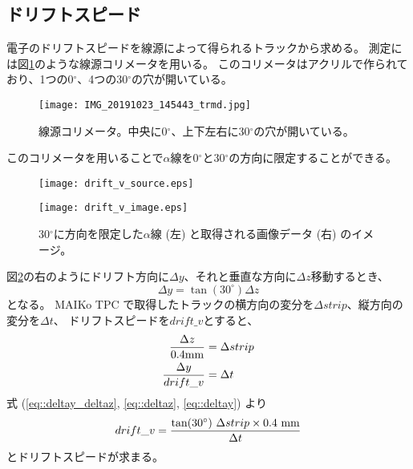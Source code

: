 \documentclass[../master]{subfiles}
\begin{document}
\subsection{ドリフトスピード}
電子のドリフトスピードを線源によって得られるトラックから求める。
測定には図\ref{pic::collimator}のような線源コリメータを用いる。
このコリメータはアクリルで作られており、1つの0${}^{\circ}$、4つの30${}^{\circ}$の穴が開いている。
\begin{figure}
  \centering
  \texttt{[image: IMG\_20191023\_145443\_trmd.jpg]}
  \caption[線源コリメータ。]
          {線源コリメータ。中央に0${}^{\circ}$、上下左右に30${}^{\circ}$の穴が開いている。}
  \label{pic::collimator}  
\end{figure}
このコリメータを用いることで$\alpha$線を0${}^{\circ}$と30${}^{\circ}$の方向に限定することができる。
\begin{figure}
  \centering
  \begin{minipage}{0.45\columnwidth}
    \centering
    \texttt{[image: drift\_v\_source.eps]}
  \end{minipage}
  \begin{minipage}{0.45\columnwidth}
    \centering
    \texttt{[image: drift\_v\_image.eps]}
  \end{minipage}
  \caption[30${}^{\circ}$に方向を限定した$\alpha$線と取得される画像データのイメージ。]
          {30${}^{\circ}$に方向を限定した$\alpha$線 (左) と取得される画像データ (右) のイメージ。}
  \label{fig::drift_v_image}
\end{figure}
図\ref{fig::drift_v_image}の右のようにドリフト方向に$\Delta y$、それと垂直な方向に$\Delta z$移動するとき、
\begin{equation}
  \Delta y = \tan(30^{\circ})\Delta z \label{eq::deltay_deltaz}
\end{equation}
となる。
MAIKo TPC で取得したトラックの横方向の変分を$\Delta strip$、縦方向の変分を$\Delta t$、
ドリフトスピードを$drift\_v$とすると、
\begin{align}
  \frac{\Delta z}{0.4 {\rm mm}} & = \Delta strip \label{eq::deltaz}\\
  \frac{\Delta y}{drift\_v} & = \Delta t \label{eq::deltay}
\end{align}
式 (\ref{eq::deltay_deltaz}, \ref{eq::deltaz}, \ref{eq::deltay}) より
\begin{equation}
  drift\_v = \frac{\tan(30^{\circ})~\Delta strip\times0.4~{\rm mm}}{\Delta t}
\end{equation}
とドリフトスピードが求まる。
\end{document}

